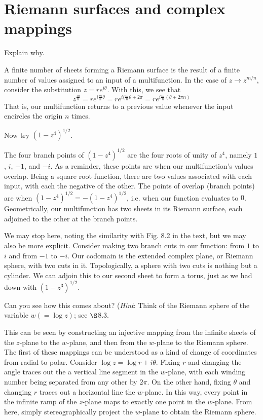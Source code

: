 \documentclass[../the-road-to-reality.tex]{subfiles}
\begin{document}
\section{Riemann surfaces and complex mappings}

\begin{questions}
	
\question Explain why.

\begin{solution}
	A finite number of sheets forming a Riemann surface is the result of a finite number of values assigned to an input of a multifunction. In the case of $z\to{z^{m/n}}$, consider the substitution $z = re^{i\theta}$. With this, we see that $$z^{\frac{m}{n}} = re^{i\frac{m}{n}\theta} = re^{i(\frac{m}{n}\theta + 2\pi} = re^{i\frac{m}{n}(\theta+2\pi{n})}$$ That is, our multifunction returns to a previous value whenever the input encircles the origin $n$ times.
\end{solution}

\question Now try $(1 - z^4)^{1/2}$.

\begin{solution}
	The four branch points of $(1 - z^4)^{1/2}$ are the four roots of unity of $z^4$, namely $1$, $i$, $-1$, and $-i$. As a reminder, these points are when our multifunction's values overlap. Being a square root function, there are two values associated with each input, with each the negative of the other. The points of overlap (branch points) are when $(1-z^4)^{1/2} = -(1-z^4)^{1/2}$, i.e. when our function evaluates to $0$. Geometrically, our multifunction has two sheets in its Riemann surface, each adjoined to the other at the branch points.

	We may stop here, noting the similarity with Fig. 8.2 in the text, but we may also be more explicit. Consider making two branch cuts in our function: from $1$ to $i$ and from $-1$ to $-i$. Our codomain is the extended complex plane, or Riemann sphere, with two cuts in it. Topologically, a sphere with two cuts is nothing but a cylinder. We can adjoin this to our second sheet to form a torus, just as we had down with $(1 - z^3)^{1/2}$.
\end{solution}

\question Can you see how this comes about? (\textit{Hint}: Think of the Riemann sphere of the variable $w(=\log{z})$; see $\S$8.3.

\begin{solution}
	This can be seen by constructing an injective mapping from the infinite sheets of the $z$-plane to the $w$-plane, and then from the $w$-plane to the Riemann sphere. The first of these mappings can be understood as a kind of change of coordinates from radial to polar. Consider $\log{z}=\log{r} + i\theta$. Fixing $r$ and changing the angle traces out the a vertical line segment in the $w$-plane, with each winding number being separated from any other by $2\pi$. On the other hand, fixing $\theta$ and changing $r$ traces out a horizontal line the $w$-plane. In this way, every point in the infinite ramp of the $z$-plane maps to exactly one point in the $w$-plane. From here, simply stereographically project the $w$-plane to obtain the Riemann sphere.
\end{solution}


\end{questions}
\end{document}
